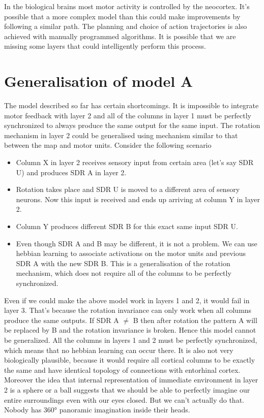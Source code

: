 \documentclass[12pt]{article}
\begin{document}
In the biological brains most motor activity is controlled by the neocortex. It's possible that a more complex model than this could make improvements by following a similar path. The planning and choice of action trajectories is also achieved with manually programmed algorithms. It is possible that we are missing some layers that could intelligently perform this process.


\section{Generalisation of model A}

The model described so far has certain shortcomings.  It is impossible to integrate motor feedback with layer 2 and all of the columns in layer 1 must be perfectly synchronized to always produce the same output for the same input. The rotation mechanism in layer 2 could be generalised using mechanism similar to that between the map and motor units. Consider the following scenario
\begin{itemize}
	\item Column X in layer 2  receives sensory input from certain area (let's say SDR U) and produces SDR A in layer 2.
	\item Rotation takes place and SDR U is moved to a different area of sensory neurons. Now this input is received and ends up arriving at column Y in layer 2.
	\item Column Y produces different SDR B for this exact same input SDR U.
	\item Even though SDR A and B may be different, it is not a problem. We can use hebbian learning to associate activations on the motor units and previous SDR A with the new SDR B. This is a generalisation of the rotation mechanism, which does not require all of the columns to be perfectly synchronized.
\end{itemize} 
Even if we could make the above model work in layers 1 and 2, it would fail in layer 3. That's because the rotation invariance can only work when all columns produce the same outputs. If SDR A $\ne$ B then after rotation the pattern A will be replaced by B and the rotation invariance is broken. Hence this model cannot be generalized. All the columns in layers 1 and 2 must be perfectly synchronized, which means that no hebbian learning can occur there. It is also not very biologically plausible, because it would require all cortical columns to be exactly the same and have identical topology of connections  with entorhinal cortex. Moreover the idea that internal representation of immediate environment in layer 2 is a sphere or a ball suggests that we should be able to perfectly imagine our entire surroundings even with our eyes closed. But we can't actually do that. Nobody has 360° panoramic imagination inside their heads. 
\end{document}
